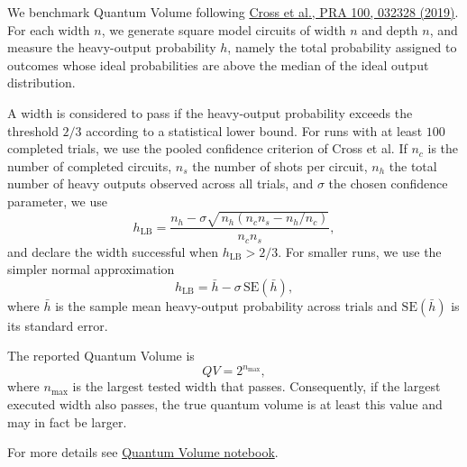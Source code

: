 We benchmark Quantum Volume following \href{https://journals.aps.org/pra/abstract/10.1103/PhysRevA.100.032328}{Cross et al., PRA 100, 032328 (2019)}. For each width \(n\), we generate square model circuits of width \(n\) and depth \(n\), and measure the heavy-output probability \(h\), namely the total probability assigned to outcomes whose ideal probabilities are above the median of the ideal output distribution.

A width is considered to pass if the heavy-output probability exceeds the threshold \(2/3\) according to a statistical lower bound. For runs with at least \(100\) completed trials, we use the pooled confidence criterion of Cross et al. If \(n_c\) is the number of completed circuits, \(n_s\) the number of shots per circuit, \(n_h\) the total number of heavy outputs observed across all trials, and \(\sigma\) the chosen confidence parameter, we use
\[
h_{\mathrm{LB}}
=
\frac{n_h - \sigma \sqrt{\,n_h\!\left(n_c n_s - n_h/n_c\right)}}{n_c n_s},
\]
and declare the width successful when \(h_{\mathrm{LB}} > 2/3\). For smaller runs, we use the simpler normal approximation
\[
h_{\mathrm{LB}} = \bar{h} - \sigma \,\mathrm{SE}(\bar{h}),
\]
where \(\bar{h}\) is the sample mean heavy-output probability across trials and \(\mathrm{SE}(\bar{h})\) is its standard error.

The reported Quantum Volume is
\[
QV = 2^{n_{\max}},
\]
where \(n_{\max}\) is the largest tested width that passes. Consequently, if the largest executed width also passes, the true quantum volume is at least this value and may in fact be larger.
\smallskip

For more details see \href{https://github.com/softqlib/softqlib-quantum-algorithms/tree/main/benchmarking/protocols/quantum\_volume\_protocol.ipynb}{Quantum Volume notebook}.
\medskip
